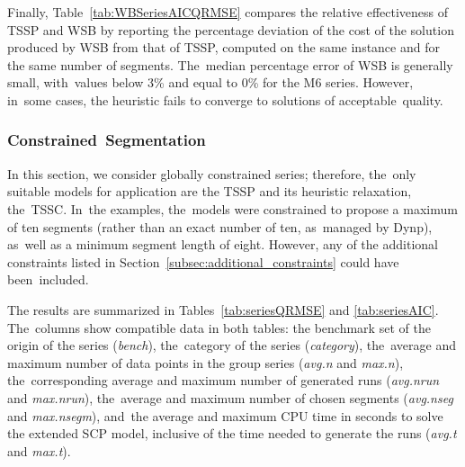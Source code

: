 \documentclass[mathematics,article,accept,pdftex,moreauthors]{Definitions/mdpi}
\begin{document}
Finally, Table~\ref{tab:WBSeriesAICQRMSE} compares the relative effectiveness of TSSP and WSB by reporting the percentage deviation of the cost of the solution produced by WSB from that of TSSP, computed on the same instance and for the same number of segments. The~median percentage error of WSB is generally small, with~values below 3\% and equal to 0\% for the M6 series. However, in~some cases, the heuristic fails to converge to solutions of acceptable~quality.

\subsubsection{Constrained~Segmentation}

In this section, we consider globally constrained series; therefore, the~only suitable models for application are the TSSP and its heuristic relaxation, the~TSSC. In~the examples, the~models were constrained to propose a maximum of ten segments (rather than an exact number of ten, as~managed by Dynp), as~well as a minimum segment length of eight. However, any of the additional constraints listed in Section~\ref{subsec:additional_constraints} could have been~included.

The results are summarized in Tables~\ref{tab:seriesQRMSE} and \ref{tab:seriesAIC}. The~columns show compatible data in both tables: the benchmark set of the origin of the series ({\it bench}), the~category of the series ({\it category}), the~average and maximum number of data points in the group series ({\it avg.n} and {\it max.n}), the~corresponding average and maximum number of generated runs ({\it avg.nrun} and {\it max.nrun}), the~average and maximum number of chosen segments ({\it avg.nseg} and {\it max.nsegm}), and~the average and maximum CPU time in seconds to solve the extended SCP model, inclusive of the time needed to generate the runs ({\it avg.t} and {\it max.t}).
\end{document}
